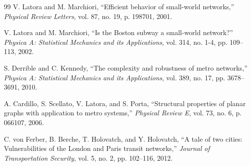 \documentclass[12pt, a4paper]{article}
\begin{document}
\begin{thebibliography}{99}
V. Latora and M. Marchiori, ``Efficient behavior of small-world networks,'' \textit{Physical Review Letters}, vol. 87, no. 19, p. 198701, 2001.

V. Latora and M. Marchiori, ``Is the Boston subway a small-world network?'' \textit{Physica A: Statistical Mechanics and its Applications}, vol. 314, no. 1-4, pp. 109--113, 2002.

S. Derrible and C. Kennedy, ``The complexity and robustness of metro networks,'' \textit{Physica A: Statistical Mechanics and its Applications}, vol. 389, no. 17, pp. 3678--3691, 2010.

A. Cardillo, S. Scellato, V. Latora, and S. Porta, ``Structural properties of planar graphs with application to metro systems,'' \textit{Physical Review E}, vol. 73, no. 6, p. 066107, 2006.

C. von Ferber, B. Berche, T. Holovatch, and Y. Holovatch, ``A tale of two cities: Vulnerabilities of the London and Paris transit networks,'' \textit{Journal of Transportation Security}, vol. 5, no. 2, pp. 102--116, 2012.
\end{thebibliography}
\end{document}
